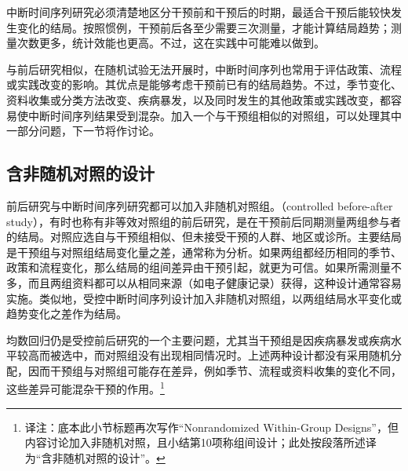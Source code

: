 中断时间序列研究必须清楚地区分干预前和干预后的时期，最适合干预后能较快发生变化的结局。按照惯例，干预前后各至少需要三次测量，才能计算结局趋势；测量次数更多，统计效能也更高。不过，这在实践中可能难以做到。

与前后研究相似，在随机试验无法开展时，中断时间序列也常用于评估政策、流程或实践改变的影响。其优点是能够考虑干预前已有的结局趋势。不过，季节变化、资料收集或分类方法改变、疾病暴发，以及同时发生的其他政策或实践改变，都容易使中断时间序列结果受到混杂。加入一个与干预组相似的对照组，可以处理其中一部分问题，下一节将作讨论。

\subsection{含非随机对照的设计}
前后研究与中断时间序列研究都可以加入非随机对照组。（controlled before-after study），有时也称有非等效对照组的前后研究，是在干预前后同期测量两组参与者的结局。对照应选自与干预组相似、但未接受干预的人群、地区或诊所。主要结局是干预组与对照组结局变化量之差，通常称为分析。如果两组都经历相同的季节、政策和流程变化，那么结局的组间差异由干预引起，就更为可信。如果所需测量不多，而且两组资料都可以从相同来源（如电子健康记录）获得，这种设计通常容易实施。类似地，受控中断时间序列设计加入非随机对照组，以两组结局水平变化或趋势变化之差作为结局。

均数回归仍是受控前后研究的一个主要问题，尤其当干预组是因疾病暴发或疾病水平较高而被选中，而对照组没有出现相同情况时。上述两种设计都没有采用随机分配，因而干预组与对照组可能存在差异，例如季节、流程或资料收集的变化不同，这些差异可能混杂干预的作用。\footnote{译注：底本此小节标题再次写作“Nonrandomized Within-Group Designs”，但内容讨论加入非随机对照，且小结第10项称组间设计；此处按段落所述译为“含非随机对照的设计”。}

